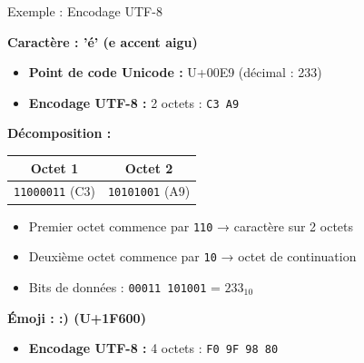 \documentclass[aspectratio=1610]{beamer}
\begin{document}
\begin{frame}{Exemple : Encodage UTF-8}

  \textbf{Caractère : 'é' (e accent aigu)}

  \begin{itemize}
    \item \textbf{Point de code Unicode :} U+00E9 (décimal : 233)
    \item \textbf{Encodage UTF-8 :} 2 octets : \texttt{C3 A9}
  \end{itemize}

  \vspace{0.3cm}

  \textbf{Décomposition :}

  \begin{center}
    \begin{tabular}{|c|c|}
      \hline
      \textbf{Octet 1} & \textbf{Octet 2} \\
      \hline
      \texttt{11000011} (C3) & \texttt{10101001} (A9) \\
      \hline
    \end{tabular}
  \end{center}

  \vspace{0.3cm}

  \begin{itemize}
    \item Premier octet commence par \texttt{110} → caractère sur 2 octets
    \item Deuxième octet commence par \texttt{10} → octet de continuation
    \item Bits de données : \texttt{00011 101001} = $233_{10}$ 
  \end{itemize}

  \vspace{0.5cm}

  \textbf{Émoji : :) (U+1F600)}

  \begin{itemize}
    \item \textbf{Encodage UTF-8 :} 4 octets : \texttt{F0 9F 98 80}
  \end{itemize}

\end{frame}
%
\end{document}
